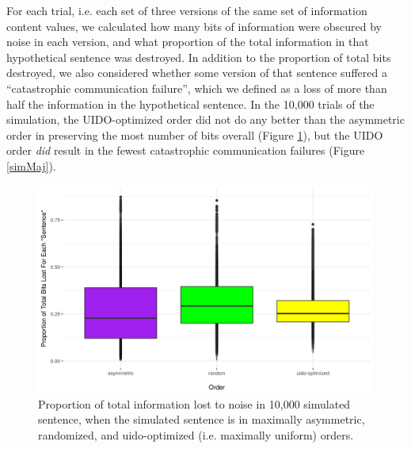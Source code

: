 \documentclass[12pt]{article}
\begin{document}
For each trial, i.e. each set of three versions of the same set of information content values, we calculated how many bits of information were obscured by noise in each version, and what proportion of the total information in that hypothetical sentence was destroyed.  In addition to the proportion of total bits destroyed, we also considered whether some version of that sentence suffered a ``catastrophic communication failure'', which we defined as a loss of more than half the information in the hypothetical sentence. In the 10,000 trials of the simulation, the UIDO-optimized order did not do any better than the asymmetric order in preserving the most number of bits overall (Figure \ref{simBits}), but the UIDO order \textsl{did} result in the fewest catastrophic communication failures (Figure \ref{simMaj}).

\begin{figure}
	\begin{center}
\includegraphics[width=.95\textwidth]{uid-sim-totalbits.png}
\caption{Proportion of total information lost to noise in 10,000 simulated sentence, when the simulated sentence is in maximally asymmetric, randomized, and uido-optimized (i.e. maximally uniform) orders.}
\label{simBits}
\end{center}
\end{figure}
\end{document}
